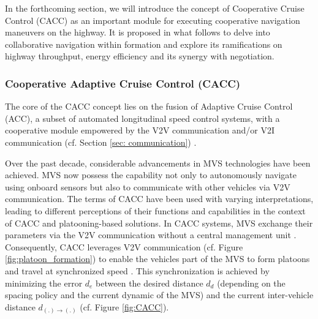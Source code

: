 In the forthcoming section, we will introduce the concept of Cooperative Cruise Control (CACC) as an important module for executing cooperative navigation maneuvers on the highway. It is proposed in what follows to delve into collaborative navigation within formation and explore its ramifications on highway throughput, energy efficiency and its synergy with negotiation. 


\subsubsection{Cooperative Adaptive Cruise Control (CACC)} \label{sec: CACC}
The core of the CACC concept lies on the fusion of Adaptive Cruise Control (ACC), a subset of automated longitudinal speed control systems, with a cooperative module empowered by the V2V communication and/or V2I communication (cf. Section \ref{sec: communication}) \cite{shladover2015cooperative}.

Over the past decade, considerable advancements in MVS technologies have been achieved. MVS now possess the capability not only to autonomously navigate using onboard sensors but also to communicate with other vehicles via V2V communication. The terms of CACC have been used with varying interpretations, leading to different perceptions of their functions and capabilities in the context of CACC and platooning-based solutions. In CACC systems, MVS exchange their parameters via the V2V communication without a central management unit \cite{wischhof2005information}. Consequently, CACC leverages V2V communication (cf. Figure \ref{fig:platoon_formation}) to enable the vehicles part of the MVS to form platoons and travel at synchronized speed \cite{wang2019survey}. This synchronization is achieved by minimizing the error $d_e$ between the desired distance $d_d$ (depending on the spacing policy and the current dynamic of the MVS) and the current inter-vehicle distance $d_{(.)→(.)}$ (cf. Figure \ref{fig:CACC}). 

